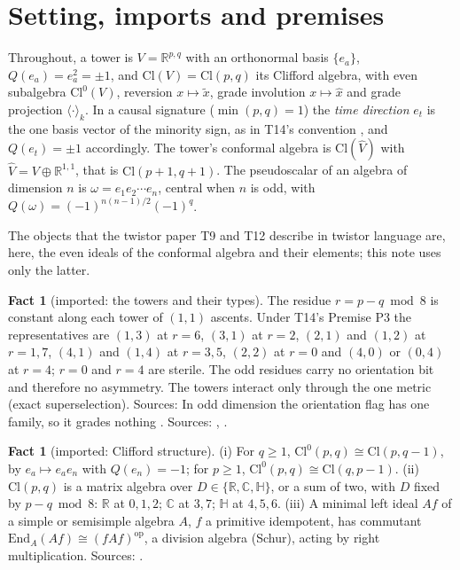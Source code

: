 \documentclass[11pt]{article}
\theoremstyle{definition}
\newtheorem{fact}[theorem]{Fact}
\newcommand{\Cl}{\mathrm{Cl}}
\newcommand{\R}{\mathbb{R}}
\newcommand{\C}{\mathbb{C}}
\newcommand{\HH}{\mathbb{H}}
\newcommand{\rev}[1]{\widetilde{#1}}
\newcommand{\ip}[1]{\langle #1 \rangle}
\newcommand{\hatV}{\widehat{V}}
\begin{document}
\section{Setting, imports and premises}\label{sec:setting}

Throughout, a tower is $V = \R^{p,q}$ with an orthonormal basis $\{e_{a}\}$, $Q(e_{a}) = e_{a}^{2} = \pm 1$, and $\Cl(V) = \Cl(p,q)$ its Clifford algebra, with even subalgebra $\Cl^{0}(V)$, reversion $x \mapsto \rev{x}$, grade involution $x \mapsto \hat{x}$ and grade projection $\ip{\cdot}_{k}$. In a causal signature ($\min(p,q) = 1$) the \emph{time direction} $e_{t}$ is the one basis vector of the minority sign, as in T14's convention \cite[Prop.~3.1]{ButlerT14}, and $Q(e_{t}) = \pm 1$ accordingly. The tower's conformal algebra is $\Cl(\hatV)$ with $\hatV = V \oplus \R^{1,1}$, that is $\Cl(p+1, q+1)$. The pseudoscalar of an algebra of dimension $n$ is $\omega = e_{1}e_{2}\cdots e_{n}$, central when $n$ is odd, with $Q(\omega) = (-1)^{n(n-1)/2}(-1)^{q}$.

The objects that the twistor paper T9 \cite{ButlerT9} and T12 describe in twistor language are, here, the even ideals of the conformal algebra and their elements; this note uses only the latter.

\begin{fact}[imported: the towers and their types]\label{fact:towers}
The residue $r = p - q \bmod 8$ is constant along each tower of $(1,1)$ ascents. Under T14's Premise P3 the representatives are $(1,3)$ at $r = 6$, $(3,1)$ at $r = 2$, $(2,1)$ and $(1,2)$ at $r = 1, 7$, $(4,1)$ and $(1,4)$ at $r = 3, 5$, $(2,2)$ at $r = 0$ and $(4,0)$ or $(0,4)$ at $r = 4$; $r = 0$ and $r = 4$ are sterile. The odd residues carry no orientation bit and therefore no asymmetry. The towers interact only through the one metric (exact superselection). Sources: In odd dimension the orientation flag has one family, so it grades nothing \cite[Prop.~3.9]{ButlerT14}. Sources: \cite[Prop.~3.1, Thm.~3.4, Prop.~3.9, Thm.~3.10, Prop.~4.1]{ButlerT14}, \cite[Thm.~3.6]{ButlerT3}.
\end{fact}

\begin{fact}[imported: Clifford structure]\label{fact:clifford}
(i) For $q \geq 1$, $\Cl^{0}(p,q) \cong \Cl(p,q-1)$, by $e_{a} \mapsto e_{a}e_{n}$ with $Q(e_{n}) = -1$; for $p \geq 1$, $\Cl^{0}(p,q) \cong \Cl(q, p-1)$. (ii) $\Cl(p,q)$ is a matrix algebra over $D \in \{\R, \C, \HH\}$, or a sum of two, with $D$ fixed by $p - q \bmod 8$: $\R$ at $0, 1, 2$; $\C$ at $3, 7$; $\HH$ at $4, 5, 6$. (iii) A minimal left ideal $Af$ of a simple or semisimple algebra $A$, $f$ a primitive idempotent, has commutant $\mathrm{End}_{A}(Af) \cong (fAf)^{\mathrm{op}}$, a division algebra (Schur), acting by right multiplication. Sources: \cite{Chevalley1954, Lounesto2001, LawsonMichelsohn1989}.
\end{fact}
\end{document}
